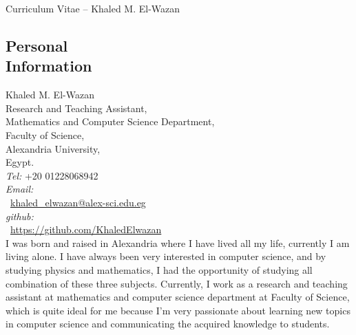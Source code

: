 \documentclass[margin,line,a4paper]{resume}
\begin{document}
{\sc \Large Curriculum Vitae -- Khaled M. El-Wazan}
\begin{resume}
    \vspace{0.5cm}
    


    \section{\mysidestyle Personal\\Information}%
    Khaled M. El-Wazan \\
    Research and Teaching Assistant,\\
    Mathematics and Computer Science Department,\\
    Faculty of Science,  \\ 
    Alexandria University, \\ 
    Egypt. \\ 
    \emph{Tel:} +20 01228068942\\
    \emph{Email:} \\~\href{mailto:khaled\_elwazan@ alex-sci.edu.eg}{khaled\_elwazan@alex-sci.edu.eg}\\
    \emph{github:} \\~\href{https://github.com/KhaledElwazan}{https://github.com/KhaledElwazan}\\
    
    
    
    
    I was born and raised in Alexandria where I have lived all my life, currently I am living alone.  I have always been very interested in computer science, and  by studying physics and mathematics, I had the opportunity of studying all combination of these three subjects. Currently, I work as a research and teaching assistant at mathematics and computer science department at Faculty of Science, which is quite ideal for me because I'm very passionate about learning new topics in computer science and communicating the acquired knowledge to students. 
    

\end{resume}
\end{document}
